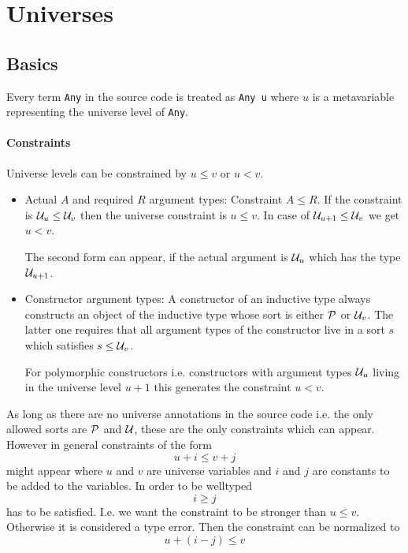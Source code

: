 \section{Universes}





\subsection{Basics}

Every term {\tt Any} in the source code is treated as {\tt Any u} where $u$ is a
metavariable representing the universe level of {\tt Any}.

\paragraph{Constraints} Universe levels can be constrained by $u \le v$ or $u <
v$.
\begin{itemize}
    \item Actual $A$ and required $R$ argument types: Constraint $A \le R$. If
        the constraint is ${\mathcal U}_u \le {\mathcal U}_v$ then the universe constraint is $u
        \le v$. In case of ${\mathcal U}_{u + 1} \le {\mathcal U}_v$ we get $u < v$.

        The second form can appear, if the actual argument is ${\mathcal U}_u$ which has
        the type ${\mathcal U}_{u + 1}$.

    \item Constructor argument types: A constructor of an inductive type always
        constructs an object of the inductive type whose sort is either ${\mathcal P}$
        or ${\mathcal U}_v$. The latter one requires that all argument types of the
        constructor live in a sort $s$ which satisfies $s \le {\mathcal U}_v$.

        For polymorphic constructors i.e. constructors with argument types
        ${\mathcal U}_u$ living in the universe level $u + 1$ this generates the
        constraint $u < v$.
\end{itemize}

As long as there are no universe annotations in the source code i.e. the only
allowed sorts are ${\mathcal P}$ and ${\mathcal U}$, these are the only constraints which can
appear. However in general constraints of the form
$$
    u + i \le v + j
$$
might appear where $u$ and $v$ are universe variables and $i$ and $j$ are
constants to be added to the variables. In order to be welltyped
$$
    i \ge j
$$
has to be satisfied. I.e. we want the constraint to be stronger than $u \le v$.
Otherwise it is considered a type error. Then the constraint can be normalized
to
$$
    u + (i - j) \le v
$$


